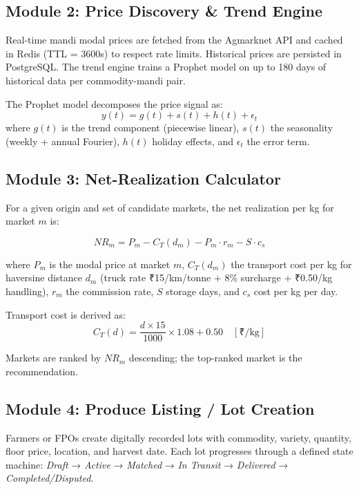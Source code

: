 \documentclass[conference]{IEEEtran}
\begin{document}
\subsection{Module 2: Price Discovery \& Trend Engine}

Real-time mandi modal prices are fetched from the Agmarknet API and cached in Redis (TTL = 3600s) to respect rate limits. Historical prices are persisted in PostgreSQL. The trend engine trains a Prophet model on up to 180 days of historical data per commodity-mandi pair.

The Prophet model decomposes the price signal as:
\begin{equation}
y(t) = g(t) + s(t) + h(t) + \epsilon_t
\end{equation}
where $g(t)$ is the trend component (piecewise linear), $s(t)$ the seasonality (weekly + annual Fourier), $h(t)$ holiday effects, and $\epsilon_t$ the error term.

\subsection{Module 3: Net-Realization Calculator}
\label{sec:module3}

For a given origin and set of candidate markets, the net realization per kg for market $m$ is:

\begin{equation}
NR_m = P_m - C_T(d_m) - P_m \cdot r_m - S \cdot c_s
\end{equation}

where $P_m$ is the modal price at market $m$, $C_T(d_m)$ the transport cost per kg for haversine distance $d_m$ (truck rate ₹15/km/tonne + 8\% surcharge + ₹0.50/kg handling), $r_m$ the commission rate, $S$ storage days, and $c_s$ cost per kg per day.

Transport cost is derived as:
\begin{equation}
C_T(d) = \frac{d \times 15}{1000} \times 1.08 + 0.50 \quad [\text{₹/kg}]
\end{equation}

Markets are ranked by $NR_m$ descending; the top-ranked market is the recommendation.

\subsection{Module 4: Produce Listing / Lot Creation}
Farmers or FPOs create digitally recorded lots with commodity, variety, quantity, floor price, location, and harvest date. Each lot progresses through a defined state machine: \textit{Draft} → \textit{Active} → \textit{Matched} → \textit{In Transit} → \textit{Delivered} → \textit{Completed/Disputed}.
\end{document}
